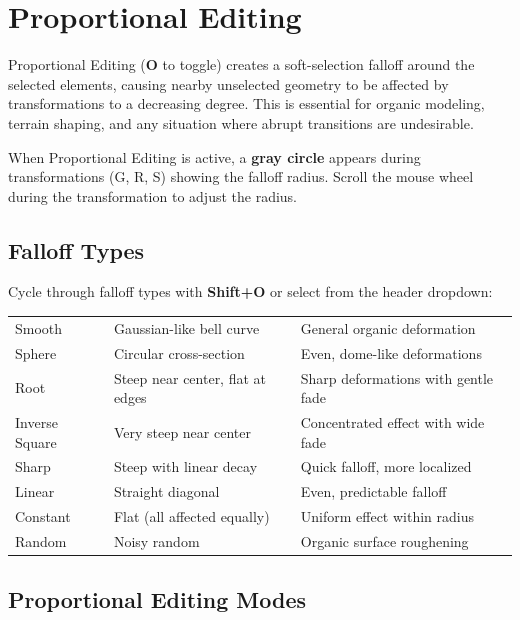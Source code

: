 \section{Proportional Editing}
\label{sec:proportional}

Proportional Editing (\textbf{O} to toggle) creates a soft-selection falloff around the selected elements, causing nearby unselected geometry to be affected by transformations to a decreasing degree. This is essential for organic modeling, terrain shaping, and any situation where abrupt transitions are undesirable.

When Proportional Editing is active, a \textbf{gray circle} appears during transformations (G, R, S) showing the falloff radius. Scroll the mouse wheel during the transformation to adjust the radius.

\subsection{Falloff Types}

Cycle through falloff types with \textbf{Shift+O} or select from the header dropdown:

\begin{center}
\begin{tabularx}{\textwidth}{L{3cm}L{4.5cm}X}
\toprule
{}
 &  &  \\
\midrule
Smooth & Gaussian-like bell curve & General organic deformation \\
Sphere & Circular cross-section & Even, dome-like deformations \\
Root & Steep near center, flat at edges & Sharp deformations with gentle fade \\
Inverse Square & Very steep near center & Concentrated effect with wide fade \\
Sharp & Steep with linear decay & Quick falloff, more localized \\
Linear & Straight diagonal & Even, predictable falloff \\
Constant & Flat (all affected equally) & Uniform effect within radius \\
Random & Noisy random & Organic surface roughening \\
\bottomrule
\end{tabularx}
\end{center}

\subsection{Proportional Editing Modes}

